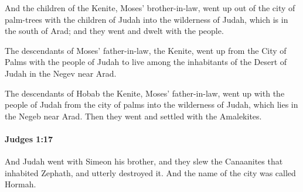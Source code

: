 			\begin{versebox}
					\item[BHS] 
					\item[ASV] And the children of the Kenite, Moses' brother-in-law, went up out of the city of palm-trees with the children of Judah into the wilderness of Judah, which is in the south of Arad; and they went and dwelt with the people.
					\item[NIV] The descendants of Moses’ father-in-law, the Kenite, went up from the City of Palms with the people of Judah to live among the inhabitants of the Desert of Judah in the Negev near Arad.
					\item[NRSV] The descendants of Hobab the Kenite, Moses’ father-in-law, went up with the people of Judah from the city of palms into the wilderness of Judah, which lies in the Negeb near Arad. Then they went and settled with the Amalekites.
			\end{versebox}

		\paragraph{Judges 1:17} %
			\label{JUDGES-1-17}

			And Judah went with Simeon his brother, and they slew the Canaanites that inhabited Zephath, and utterly destroyed it. And the name of the city was called Hormah.

